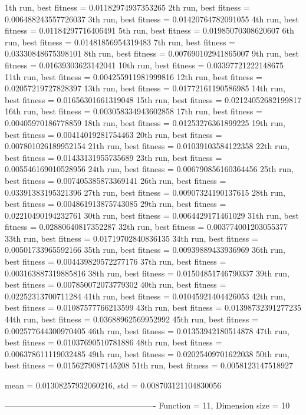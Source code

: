 1th run, best fitness = 0.01182974937353265
2th run, best fitness = 0.006488243557726037
3th run, best fitness = 0.01420764782091055
4th run, best fitness = 0.01184297716406491
5th run, best fitness = 0.01985070308620607
6th run, best fitness = 0.01481856954319483
7th run, best fitness = 0.03330848675398101
8th run, best fitness = 0.007690102941865007
9th run, best fitness = 0.01639303623142041
10th run, best fitness = 0.03397721222148675
11th run, best fitness = 0.004255911981999816
12th run, best fitness = 0.02057219727828397
13th run, best fitness = 0.01772161190586985
14th run, best fitness = 0.01656301661319048
15th run, best fitness = 0.02124052682199817
16th run, best fitness = 0.003058334943602858
17th run, best fitness = 0.00405970186778859
18th run, best fitness = 0.01253276361899225
19th run, best fitness = 0.00414019281754463
20th run, best fitness = 0.007801026189952154
21th run, best fitness = 0.01039103584122358
22th run, best fitness = 0.01433131955735689
23th run, best fitness = 0.005546169010528956
24th run, best fitness = 0.006790856160364456
25th run, best fitness = 0.007405385873369141
26th run, best fitness = 0.03391383195321396
27th run, best fitness = 0.00907324190137615
28th run, best fitness = 0.004861913875743085
29th run, best fitness = 0.02210490194232761
30th run, best fitness = 0.0064429171461029
31th run, best fitness = 0.02880640817352287
32th run, best fitness = 0.003774001203055377
33th run, best fitness = 0.01719702840836135
34th run, best fitness = 0.00501733965592166
35th run, best fitness = 0.00939889433936969
36th run, best fitness = 0.004439829572277176
37th run, best fitness = 0.003163887319885816
38th run, best fitness = 0.01504851746790337
39th run, best fitness = 0.007850072073779302
40th run, best fitness = 0.02252313700711284
41th run, best fitness = 0.01045921404426053
42th run, best fitness = 0.01087577766213599
43th run, best fitness = 0.01398732391277235
44th run, best fitness = 0.03688962569952992
45th run, best fitness = 0.002577644300970405
46th run, best fitness = 0.01353942180514878
47th run, best fitness = 0.01037690510781886
48th run, best fitness = 0.006378611119032485
49th run, best fitness = 0.02025409701622038
50th run, best fitness = 0.0156279087145208
51th run, best fitness = 0.0058123147518927

mean = 0.01308257932060216, std = 0.008703121104830056

-------------------------------------------------------
Function = 11, Dimension size = 10

